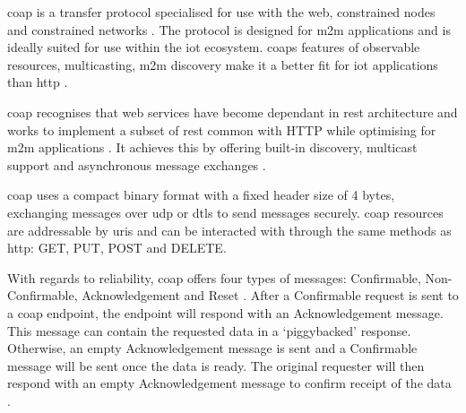 \acrfull{coap} is a transfer protocol specialised for use with the web, constrained
nodes and constrained networks \citep{shelby_constrained_2014}. The protocol is 
designed for \gls{m2m} applications and is ideally suited for use within the 
\gls{iot} ecosystem. \glspl{coap} features of observable resources, multicasting, \gls{m2m} discovery 
make it a better fit for \gls{iot} applications than \gls{http} \citep{kovatsch_californium:_2014}.

\gls{coap} recognises that web services have become dependant in \gls{rest} 
architecture and works to implement a subset of \gls{rest} common with HTTP while
optimising for \gls{m2m} applications \citep{shelby_constrained_2014}. It achieves 
this by offering built-in discovery, multicast support and asynchronous message 
exchanges \citep{shelby_constrained_2014}. 

\gls{coap} uses a compact binary format with a fixed header size of 4 bytes, 
exchanging messages over \gls{udp} or \gls{dtls} to send messages securely. \gls{coap} 
resources are addressable by \glspl{uri} and can be interacted with through the 
same methods as \gls{http}: GET, PUT, POST and DELETE.

With regards to reliability, \gls{coap} offers four types of messages: Confirmable, 
Non-Confirmable, Acknowledgement and Reset \citep{bellavista_towards_2016}.
After a Confirmable request is sent to a \gls{coap} endpoint, the endpoint will 
respond with an Acknowledgement message. This message can contain the requested 
data in a `piggybacked' response. Otherwise, an empty Acknowledgement message is sent 
and a Confirmable message will be sent once the data is ready. The original
requester will then respond with an empty Acknowledgement message to confirm receipt 
of the data \citep{shelby_constrained_2014}.
